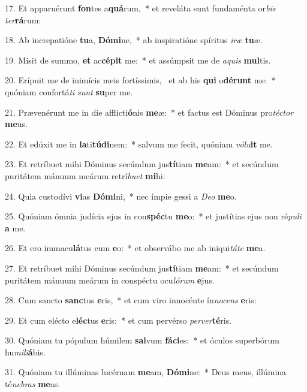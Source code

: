 17. Et apparuérunt \textbf{fon}tes a\textbf{quá}rum,~*  et reveláta sunt fundaménta or\textit{bis} \textit{ter}\textbf{rá}rum:\

18. Ab increpatióne \textbf{tu}a, \textbf{Dó}\textbf{mi}ne,~*  ab inspiratióne spíritus \textit{i}\textit{ræ} \textbf{tu}æ.\

19. Misit de summo, \textbf{et} ac\textbf{cé}\textbf{pit} me:~*  et assúmpsit me de \textit{a}\textit{quis} \textbf{mul}tis.\

20. Erípuit me de inimícis meis fortíssimis, \dag\  et ab his \textbf{qui} o\textbf{dé}\textbf{runt} me:~*  quóniam confortá\textit{ti} \textit{sunt} \textbf{su}per me.\

21. Prævenérunt me in die afflicti\textbf{ó}nis \textbf{me}æ:~*  et factus est Dóminus pro\textit{téc}\textit{tor} \textbf{me}us.\

22. Et edúxit me in \textbf{la}ti\textbf{tú}\textbf{di}nem:~*  salvum me fecit, quóniam \textit{vó}\textit{lu}\textbf{it} me.\

23. Et retríbuet mihi Dóminus secúndum jus\textbf{tí}tiam \textbf{me}am:~*  et secúndum puritátem mánuum meárum retrí\textit{bu}\textit{et} \textbf{mi}hi:\

24. Quia custodívi \textbf{vi}as \textbf{Dó}\textbf{mi}ni,~*  nec ímpie gessi a \textit{De}\textit{o} \textbf{me}o.\

25. Quóniam ómnia judícia ejus in con\textbf{spéc}tu \textbf{me}o:~*  et justítias ejus non ré\textit{pu}\textit{li} \textbf{a} me.\

26. Et ero immacu\textbf{lá}tus cum \textbf{e}o:~*  et observábo me ab iniqui\textit{tá}\textit{te} \textbf{me}a.\

27. Et retríbuet mihi Dóminus secúndum jus\textbf{tí}tiam \textbf{me}am:~*  et secúndum puritátem mánuum meárum in conspéctu ocu\textit{ló}\textit{rum} \textbf{e}jus.\

28. Cum sancto \textbf{sanc}tus \textbf{e}ris,~*  et cum viro innocénte ín\textit{no}\textit{cens} \textbf{e}ris:\

29. Et cum elécto e\textbf{léc}tus \textbf{e}ris:~*  et cum pervérso \textit{per}\textit{ver}\textbf{té}ris.\

30. Quóniam tu pópulum húmilem \textbf{sal}vum \textbf{fá}\textbf{ci}es:~*  et óculos superbórum hu\textit{mi}\textit{li}\textbf{á}bis.\

31. Quóniam tu illúminas lucérnam \textbf{me}am, \textbf{Dó}\textbf{mi}ne:~*  Deus meus, illúmina té\textit{ne}\textit{bras} \textbf{me}as.\

